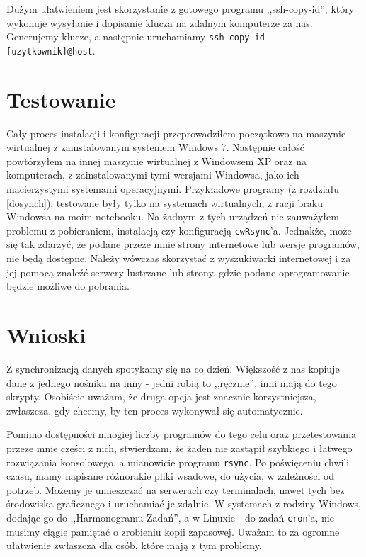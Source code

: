 Dużym ułatwieniem jest skorzystanie z gotowego programu ,,ssh-copy-id''\cite{9}, który wykonuje wysyłanie i dopisanie klucza na zdalnym komputerze za nas. Generujemy klucze, a następnie uruchamiamy \verb|ssh-copy-id  [uzytkownik]@host|.

\section{Testowanie}
Cały proces instalacji i konfiguracji przeprowadziłem początkowo na maszynie wirtualnej z zainstalowanym systemem Windows 7. Następnie całość powtórzyłem na innej maszynie wirtualnej z Windowsem XP oraz na komputerach, z zainstalowanymi tymi wersjami Windowsa, jako ich macierzystymi systemami operacyjnymi. Przykładowe programy (z rozdziału \ref{dosynch}). testowane były tylko na systemach wirtualnych, z racji braku Windowsa na moim notebooku. Na żadnym z tych urządzeń nie zauważyłem problemu z pobieraniem, instalacją czy konfiguracją \verb|cwRsync|'a. Jednakże, może się tak zdarzyć, że podane przeze mnie strony internetowe lub wersje programów, nie będą dostępne. Należy wówczas skorzystać z wyszukiwarki internetowej i za jej pomocą znaleźć serwery lustrzane lub strony, gdzie podane oprogramowanie będzie możliwe do pobrania. 

\section{Wnioski}
Z synchronizacją danych spotykamy się na co dzień. Większość z nas kopiuje dane z jednego nośnika na inny - jedni robią to ,,ręcznie'', inni mają do tego skrypty. Osobiście uważam, że druga opcja jest znacznie korzystniejsza, zwłaszcza, gdy chcemy, by ten proces wykonywał się automatycznie. 

Pomimo dostępności mnogiej liczby programów do tego celu oraz przetestowania przeze mnie części z nich, stwierdzam, że żaden nie zastąpił szybkiego i łatwego rozwiązania konsolowego, a mianowicie programu \verb|rsync|. Po poświęceniu chwili czasu, mamy napisane różnorakie pliki wsadowe, do użycia, w zależności od potrzeb. Możemy je umieszczać na serwerach czy terminalach, nawet tych bez środowiska graficznego i uruchamiać je zdalnie. W systemach z rodziny Windows, dodając go do ,,Harmonogramu Zadań'', a w Linuxie - do zadań \verb|cron|'a, nie musimy ciągle pamiętać o zrobieniu kopii zapasowej. Uważam to za ogromne ułatwienie zwłaszcza dla osób, które mają z tym problemy. 





